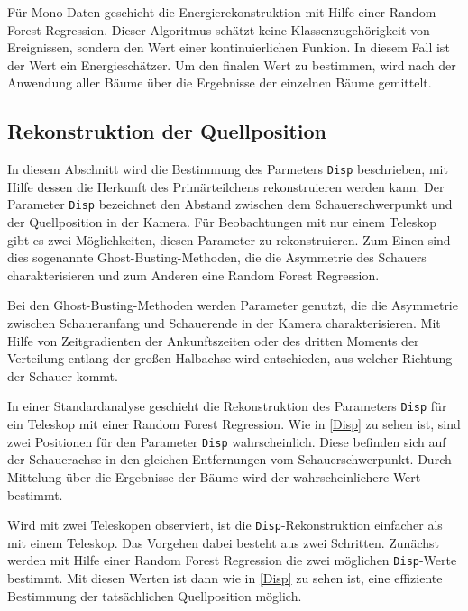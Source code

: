 Für Mono-Daten geschieht die Energierekonstruktion mit Hilfe einer Random Forest Regression.
Dieser Algoritmus schätzt keine Klassenzugehörigkeit von Ereignissen, sondern den Wert einer kontinuierlichen Funkion. 
In diesem Fall ist der Wert ein Energieschätzer.
Um den finalen Wert zu bestimmen, wird nach der Anwendung aller Bäume über die Ergebnisse der einzelnen Bäume gemittelt.\cite{EnergieRekonstruktion} 


\subsection{Rekonstruktion der Quellposition}
In diesem Abschnitt wird die Bestimmung des Parmeters \texttt{Disp} beschrieben, mit Hilfe dessen die Herkunft des Primärteilchens rekonstruieren werden kann. 
Der Parameter \texttt{Disp} bezeichnet den Abstand zwischen dem Schauerschwerpunkt und der Quellposition in der Kamera.
Für Beobachtungen mit nur einem Teleskop gibt es zwei Möglichkeiten, diesen Parameter zu rekonstruieren. 
Zum Einen sind dies sogenannte Ghost-Busting-Methoden, die die Asymmetrie des Schauers charakterisieren und zum Anderen eine Random Forest Regression.\cite{DispRekonstruktion}

Bei den Ghost-Busting-Methoden werden Parameter genutzt, die die Asymmetrie zwischen Schaueranfang und Schauerende in der Kamera charakterisieren.
Mit Hilfe von Zeitgradienten der Ankunftszeiten oder des dritten Moments der Verteilung entlang der großen Halbachse wird entschieden, aus welcher Richtung der Schauer kommt.\cite{DispRekonstruktion}

In einer Standardanalyse geschieht die Rekonstruktion des Parameters \texttt{Disp} für ein Teleskop mit einer Random Forest Regression.
Wie in \autoref{Disp} zu sehen ist, sind zwei Positionen für den Parameter \texttt{Disp} wahrscheinlich.
Diese befinden sich auf der Schauerachse in den gleichen Entfernungen vom Schauerschwerpunkt.
Durch Mittelung über die Ergebnisse der Bäume wird der wahrscheinlichere Wert bestimmt.\cite{DispRekonstruktion}

Wird mit zwei Teleskopen observiert, ist die \texttt{Disp}-Rekonstruktion einfacher als mit einem Teleskop.
Das Vorgehen dabei besteht aus zwei Schritten.
Zunächst werden mit Hilfe einer Random Forest Regression die zwei möglichen \texttt{Disp}-Werte bestimmt.
Mit diesen Werten ist dann wie in \autoref{Disp} zu sehen ist, eine effiziente Bestimmung der tatsächlichen Quellposition möglich.

